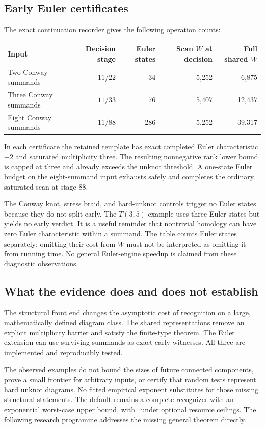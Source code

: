 \subsection{Early Euler certificates}
The exact continuation recorder gives the following operation counts:
\begin{center}\small
\begin{tabular}{@{}lrrrr@{}}
\toprule
Input & Decision stage & Euler states & Scan $W$ at decision & Full shared $W$\\
\midrule
Two Conway summands & $11/22$ & 34 & 5,252 & 6,875\\
Three Conway summands & $11/33$ & 76 & 5,407 & 12,437\\
Eight Conway summands & $11/88$ & 286 & 5,252 & 39,317\\
\bottomrule
\end{tabular}
\end{center}
In each certificate the retained template has exact completed Euler
characteristic $+2$ and saturated multiplicity three. The resulting
nonnegative rank lower bound is capped at three and already exceeds the
unknot threshold. A one-state Euler budget on the eight-summand input
exhausts safely and completes the ordinary saturated scan at stage 88.

The Conway knot, stress braid, and hard-unknot controls trigger no Euler
states because they do not split early. The $T(3,5)$ example uses three
Euler states but yields no early verdict. It is a useful reminder that
nontrivial homology can have zero Euler characteristic within a summand.
The table counts Euler states separately: omitting their cost from $W$
must not be interpreted as omitting it from running time. No general
Euler-engine speedup is claimed from these diagnostic observations.

\subsection{What the evidence does and does not establish}
The structural front end changes the asymptotic cost of recognition on a
large, mathematically defined diagram class. The shared representations
remove an explicit multiplicity barrier and satisfy the finite-type theorem.
The Euler extension can use surviving summands as exact early witnesses.
All three are implemented and reproducibly tested.

The observed examples do not bound the sizes of future connected components,
prove a small frontier for arbitrary inputs, or certify that random tests
represent hard unknot diagrams. No fitted empirical exponent substitutes
for those missing structural statements. The default remains a complete
recognizer with an exponential worst-case upper bound, with \UNKNOWN\ under
optional resource ceilings. The following research programme addresses the
missing general theorem directly.
